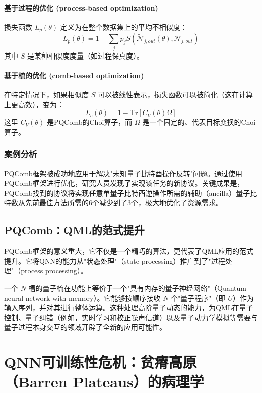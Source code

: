 \documentclass[12pt,a4paper]{article}
\begin{document}
\paragraph{基于过程的优化 (process-based optimization)}
损失函数 $L_p(\theta)$ 定义为在整个数据集上的平均不相似度：
\begin{equation}
L_p(\theta) = 1 - \sum_j p_j S(\tilde{\mathcal{N}}_{j,out}(\theta), \mathcal{N}_{j,out})
\end{equation}
其中 $S$ 是某种相似度度量（如过程保真度）。

\paragraph{基于梳的优化 (comb-based optimization)}
在特定情况下，如果相似度 $S$ 可以被线性表示，损失函数可以被简化（这在计算上更高效），变为：
\begin{equation}
L_c(\theta) = 1 - \text{Tr}[C_V(\theta)\Omega]
\end{equation}
这里 $C_V(\theta)$ 是PQComb的Choi算子，而 $\Omega$ 是一个固定的、代表目标变换的Choi算子。

\subsubsection{案例分析}

PQComb框架被成功地应用于解决"未知量子比特酉操作反转"问题。通过使用PQComb框架进行优化，研究人员发现了实现该任务的新协议。关键成果是，PQComb找到的协议将实现任意单量子比特酉逆操作所需的辅助（ancilla）量子比特数从先前最佳方法所需的6个减少到了3个，极大地优化了资源需求。

\subsection{PQComb：QML的范式提升}

PQComb框架的意义重大，它不仅是一个精巧的算法，更代表了QML应用的范式提升。它将QNN的能力从"状态处理"（state processing）推广到了"过程处理"（process processing）。

一个 $N$-槽的量子梳在功能上等价于一个"具有内存的量子神经网络"（Quantum neural network with memory）。它能够按顺序接收 $N$ 个"量子程序"（即 $U$）作为输入序列，并对其进行整体运算。这种处理高阶量子动态的能力，为QML在量子控制、量子纠错（例如，实时学习和校正噪声信道）以及量子动力学模拟等需要与量子过程本身交互的领域开辟了全新的应用可能性。

\section{QNN可训练性危机：贫瘠高原（Barren Plateaus）的病理学}
\end{document}
